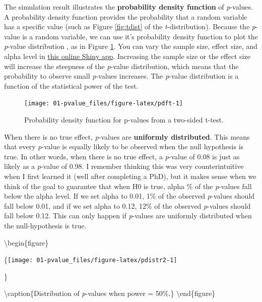 \documentclass[
]{krantz}
\begin{document}
The simulation result illustrates the \textbf{probability density function} of \emph{p}-values. A probability density function provides the probability that a random variable has a specific value (such as Figure \ref{fig:tdist} of the \emph{t}-distribution). Because the \emph{p}-value is a random variable, we can use it's probability density function to plot the \emph{p}-value distribution \citep{hung_behavior_1997, ulrich_properties_2018}, as in Figure \ref{fig:pdft}. You can vary the sample size, effect size, and alpha level in \href{http://shiny.ieis.tue.nl/d_p_power/}{this online Shiny app}. Increasing the sample size or the effect size will increase the steepness of the \emph{p}-value distribution, which means that the probability to observe small \emph{p}-values increases. The \emph{p}-value distribution is a function of the statistical power of the test.

\begin{figure}

{\centering \texttt{[image: 01-pvalue\_files/figure-latex/pdft-1]} 

}

\caption{Probability density function for p-values from a two-sided t-test.}\label{fig:pdft}
\end{figure}

When there is no true effect, \emph{p}-values are \textbf{uniformly distributed}. This means that every \emph{p}-value is equally likely to be observed when the null hypothesis is true. In other words, when there is no true effect, a \emph{p}-value of 0.08 is just as likely as a \emph{p}-value of 0.98. I remember thinking this was very counterintuitive when I first learned it (well after completing a PhD), but it makes sense when we think of the goal to guarantee that when H0 is true, alpha \% of the \emph{p}-values fall below the alpha level. If we set alpha to 0.01, 1\% of the observed \emph{p}-values should fall below 0.01, and if we set alpha to 0.12, 12\% of the observed \emph{p}-values should fall below 0.12. This can only happen if \emph{p}-values are uniformly distributed when the null-hypothesis is true.

\textbackslash begin\{figure\}

\{\centering \texttt{[image: 01-pvalue\_files/figure-latex/pdistr2-1]}

\}

\textbackslash caption\{Distribution of \emph{p}-values when power = 50\%.\}\label{fig:pdistr2}
\textbackslash end\{figure\}
\end{document}
